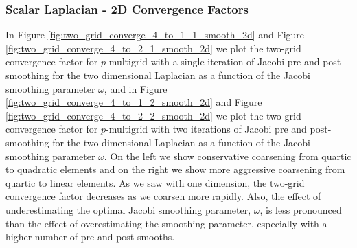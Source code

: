 \subsubsection{Scalar Laplacian - 2D Convergence Factors}\label{sec:2dresults}


In Figure \ref{fig:two_grid_converge_4_to_1_1_smooth_2d} and Figure \ref{fig:two_grid_converge_4_to_2_1_smooth_2d} we plot the two-grid convergence factor for $p$-multigrid with a single iteration of Jacobi pre and post-smoothing for the two dimensional Laplacian as a function of the Jacobi smoothing parameter $\omega$,
and in Figure \ref{fig:two_grid_converge_4_to_1_2_smooth_2d} and Figure \ref{fig:two_grid_converge_4_to_2_2_smooth_2d} we plot the two-grid convergence factor for $p$-multigrid with two iterations of Jacobi pre and post-smoothing for the two dimensional Laplacian as a function of the Jacobi smoothing parameter $\omega$.
On the left we show conservative coarsening from quartic to quadratic elements and on the right we show more aggressive coarsening from quartic to linear elements.
As we saw with one dimension, the two-grid convergence factor decreases as we coarsen more rapidly.
Also, the effect of underestimating the optimal Jacobi smoothing parameter, $\omega$, is less pronounced than the effect of overestimating the smoothing parameter, especially with a higher number of pre and post-smooths.

